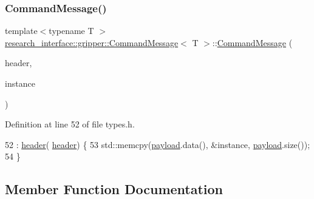 \mbox{\label{structresearch__interface_1_1gripper_1_1CommandMessage_a0f24a8d2d62ec21c3a821a9949b119c1}} 
\subsubsection{\texorpdfstring{Command\+Message()}{CommandMessage()}\hspace{0.1cm}{\footnotesize\ttfamily [2/2]}}
{\footnotesize\ttfamily template$<$typename T $>$ \\
\hyperlink{structresearch__interface_1_1gripper_1_1CommandMessage}{research\+\_\+interface\+::gripper\+::\+Command\+Message}$<$ T $>$\+::\hyperlink{structresearch__interface_1_1gripper_1_1CommandMessage}{Command\+Message} (\begin{DoxyParamCaption}\item[{const \hyperlink{structresearch__interface_1_1gripper_1_1CommandHeader}{Command\+Header} \&}]{header,  }\item[{const T \&}]{instance }\end{DoxyParamCaption})\hspace{0.3cm}{\ttfamily [inline]}}



Definition at line 52 of file types.\+h.


\begin{DoxyCode}
52                                                                  : \hyperlink{structresearch__interface_1_1gripper_1_1CommandMessage_ae32966ef012e8fc0355a775944a8cc55}{header}(
      \hyperlink{structresearch__interface_1_1gripper_1_1CommandMessage_ae32966ef012e8fc0355a775944a8cc55}{header}) \{
53     std::memcpy(\hyperlink{structresearch__interface_1_1gripper_1_1CommandMessage_ac59db82ea1c4c1da955d22f8eac3c2df}{payload}.data(), &instance, \hyperlink{structresearch__interface_1_1gripper_1_1CommandMessage_ac59db82ea1c4c1da955d22f8eac3c2df}{payload}.size());
54   \}
\end{DoxyCode}


\subsection{Member Function Documentation}
\mbox{\label{structresearch__interface_1_1gripper_1_1CommandMessage_abe34d191f846a79fa53f6596e0a49ff1}} 
